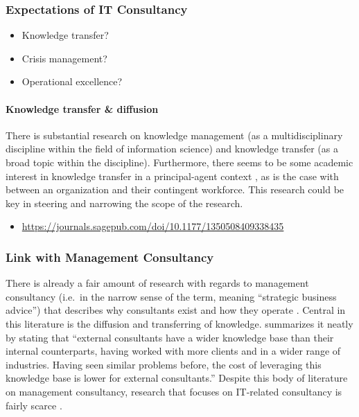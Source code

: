 \documentclass[12pt]{article}
\providecommand{\tightlist}{%
  \setlength{\itemsep}{0pt}\setlength{\parskip}{0pt}}
\begin{document}
\hypertarget{expectations-of-it-consultancy}{%
\subsubsection{Expectations of IT
Consultancy}\label{expectations-of-it-consultancy}}

\begin{itemize}
\tightlist
\item
  Knowledge transfer?
\item
  Crisis management?
\item
  Operational excellence?
\end{itemize}

\hypertarget{knowledge-transfer-diffusion}{%
\paragraph{Knowledge transfer \&
diffusion}\label{knowledge-transfer-diffusion}}

There is substantial research on knowledge management (as a
multidisciplinary discipline within the field of information science)
and knowledge transfer (as a broad topic within the discipline).
Furthermore, there seems to be some academic interest in knowledge
transfer in a principal-agent context \citep{ning2008, haines2003}, as
is the case with between an organization and their contingent workforce.
This research could be key in steering and narrowing the scope of the
research.

\begin{itemize}
\tightlist
\item
  \url{https://journals.sagepub.com/doi/10.1177/1350508409338435}
\end{itemize}

\hypertarget{link-with-management-consultancy}{%
\subsubsection{Link with Management
Consultancy}\label{link-with-management-consultancy}}

There is already a fair amount of research with regards to management
consultancy (i.e.~in the narrow sense of the term, meaning ``strategic
business advice'') that describes why consultants exist
\citep{canback1998, sturdy2009} and how they operate
\citep{clark1998, bessant1995, whittle2006}. Central in this literature
is the diffusion and transferring of knowledge. \citet{canback1999}
summarizes it neatly by stating that ``external consultants have a wider
knowledge base than their internal counterparts, having worked with more
clients and in a wider range of industries. Having seen similar problems
before, the cost of leveraging this knowledge base is lower for external
consultants.'' Despite this body of literature on management
consultancy, research that focuses on IT-related consultancy is fairly
scarce \citep{bloomfield1995, nevo2007, swanson2010}.
\end{document}
